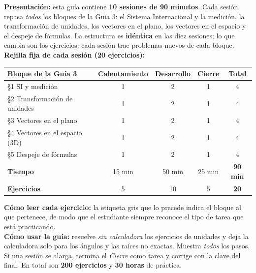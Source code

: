 \documentclass[12pt, letterpaper]{article}
\begin{document}


\vspace{4pt}
\begin{cuadroinfo}
  \small
  \textbf{Presentación:} esta guía contiene \textbf{10 sesiones de 90 minutos}. Cada sesión repasa \emph{todos} los bloques de la Guía 3: el Sistema Internacional y la medición, la transformación de unidades, los vectores en el plano, los vectores en el espacio y el despeje de fórmulas. La estructura es \textbf{idéntica} en las diez sesiones; lo que cambia son los ejercicios: cada sesión trae problemas nuevos de cada bloque.
  \\[4pt]
  \textbf{Rejilla fija de cada sesión (20 ejercicios):}
  \begin{center}
    \small
    \begin{tabular}{@{}l ccc c@{}}
      \toprule
      \textbf{Bloque de la Guía 3} & \textbf{Calentamiento} & \textbf{Desarrollo} & \textbf{Cierre} & \textbf{Total} \\
      \midrule
      §1 SI y medición                   & 1 & 2 & 1 & 4 \\
      §2 Transformación de unidades      & 1 & 2 & 1 & 4 \\
      §3 Vectores en el plano            & 1 & 2 & 1 & 4 \\
      §4 Vectores en el espacio (3D)     & 1 & 2 & 1 & 4 \\
      §5 Despeje de fórmulas             & 1 & 2 & 1 & 4 \\
      \midrule
      \textbf{Tiempo}                    & 15 min & 50 min & 25 min & \textbf{90 min} \\
      \textbf{Ejercicios}                & 5 & 10 & 5 & \textbf{20} \\
      \bottomrule
    \end{tabular}
  \end{center}
  \textbf{Cómo leer cada ejercicio:} la etiqueta gris que lo precede indica el bloque al que pertenece, de modo que el estudiante siempre reconoce el tipo de tarea que está practicando.
  \\[4pt]
  \textbf{Cómo usar la guía:} resuelve \emph{sin calculadora} los ejercicios de unidades y deja la calculadora solo para los ángulos y las raíces no exactas. Muestra \emph{todos} los pasos. Si una sesión se alarga, termina el \emph{Cierre} como tarea y corrige con la clave del final. En total son \textbf{200 ejercicios} y \textbf{30 horas} de práctica.
\end{cuadroinfo}
\end{document}
